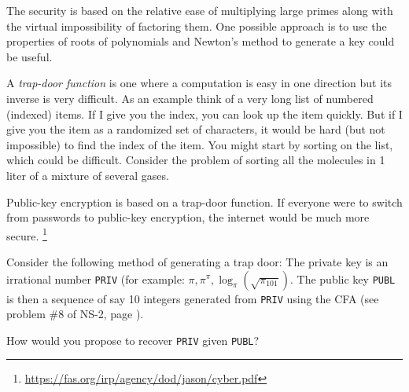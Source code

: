 \documentclass{ximera}
\begin{document}
The security is based on the relative ease of multiplying large primes along with the virtual impossibility of factoring them.
One possible approach is to use the properties of roots of polynomials and Newton's method \citep{Allen24} to generate a key could be useful.

A \emph{trap-door function} is one where a computation is easy in one direction but its inverse is very difficult. 
As an example think of a very long list of numbered (indexed) items. If I give you the index, you can look up the item quickly. But if I give you the item as a randomized set of characters, it would be hard (but not impossible) to find the index of the item.
You might start by sorting on the list, which could be difficult.
Consider the problem of sorting all the molecules in 1 liter of a mixture of several gases.
  
Public-key encryption is based on a trap-door function. %
If everyone were to switch from passwords to public-key encryption,
the internet would be much more secure.%
 \footnote{\scriptsize \url{https://fas.org/irp/agency/dod/jason/cyber.pdf}} 
  

\BEx
Consider the following method of generating a trap door: The private key is an irrational number \texttt{PRIV} (for example: $\pi, \pi^\pi, \log_\pi(\sqrt{\pi_{101}})$.
The public key \texttt{PUBL} is then a sequence of say 10 integers generated from \texttt{PRIV} using the CFA (see problem \#8 of NS-2, page \pageref{sect:cont_frac}).

How would you propose to recover \texttt{PRIV} given \texttt{PUBL}?

\EEx
\end{document}
